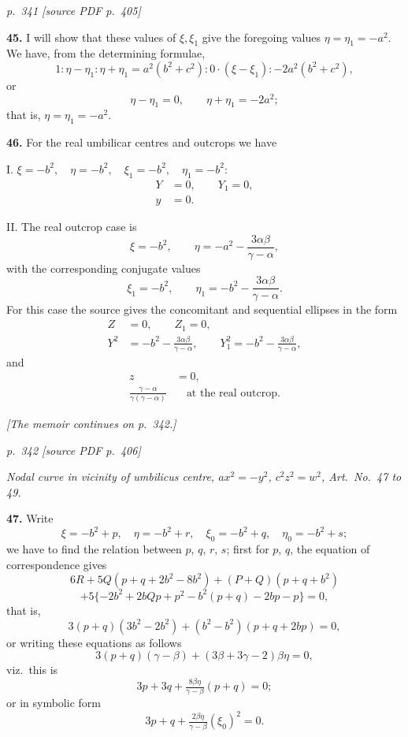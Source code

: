 \documentclass[11pt,a4paper]{article}
\newcommand{\pagemarker}[2]{\par\bigskip\noindent\textit{p.~#1 [source PDF p.~#2]}\par\smallskip}
\begin{document}
\clearpage

\pagemarker{341}{405}

\textbf{45.} I will show that these values of $\xi,\xi_1$ give the foregoing values $\eta=\eta_1=-a^2$. We have, from the determining formulae,
\[
1:\eta-\eta_1:\eta+\eta_1=a^2(b^2+c^2):0\cdot(\xi-\xi_1):-2a^2(b^2+c^2),
\]
or
\[
\eta-\eta_1=0,\qquad \eta+\eta_1=-2a^2;
\]
that is, $\eta=\eta_1=-a^2$.

\textbf{46.} For the real umbilicar centres and outcrops we have

I. $\xi=-b^2,\quad \eta=-b^2,\quad \xi_1=-b^2,\quad \eta_1=-b^2$:
\begin{align*}
Y&=0,\qquad Y_1=0,\\
y&=0.
\end{align*}

II. The real outcrop case is
\[
\xi=-b^2,\qquad \eta=-a^2-\frac{3\alpha\beta}{\gamma-\alpha},
\]
with the corresponding conjugate values
\[
\xi_1=-b^2,\qquad \eta_1=-b^2-\frac{3\alpha\beta}{\gamma-\alpha}.
\]
For this case the source gives the concomitant and sequential ellipses in the form
\begin{align*}
Z&=0,\qquad Z_1=0,\\
Y^2&=-b^2-\frac{3\alpha\beta}{\gamma-\alpha},\qquad
Y_1^2=-b^2-\frac{3\alpha\beta}{\gamma-\alpha},
\end{align*}
and
\begin{align*}
z&=0,\\
\frac{\gamma-\alpha}{\gamma(\gamma-\alpha)}&\quad\text{at the real outcrop.}
\end{align*}

\clearpage

\par\bigskip\noindent\textit{[The memoir continues on p.~342.]}

\clearpage
\bigskip
\pagemarker{342}{406}
\smallskip

\textit{Nodal curve in vicinity of umbilicus centre, $a x^2 = -y^2$, $c^2 z^2 = w^2$, Art.\ No.\ 47 to 49.}

\textbf{47.} Write
\[
\xi = -b^2 + p,\quad \eta = -b^2 + r,\quad \xi_0 = -b^2 + q, \quad \eta_0 = -b^2 + s;
\]
we have to find the relation between $p$, $q$, $r$, $s$; first for $p$, $q$, the equation of correspondence gives
\[
6R + 5Q(p + q + 2b^2 - 8b^2) + (P + Q)(p + q + b^2)
\]
\[
+ 5\{-2b^2 + 2bQp + p^2 - b^2(p + q) - 2bp - p\} = 0,
\]
that is,
\[
3(p + q)(3b^2 - 2b^2) + (b^2 - b^2)(p + q + 2bp) = 0,
\]
or writing these equations as follows
\[
3(p + q)(\gamma - \beta) + (3 \beta + 3\gamma - 2)\beta\eta = 0,
\]
viz.\ this is
\[
3p + 3q + \tfrac{8\beta\eta}{\gamma - \beta}(p + q) = 0;
\]
or in symbolic form
\[
3p + q + \tfrac{2\beta\eta}{\gamma - \beta}(\xi_0)^2 = 0.
\]
\end{document}
